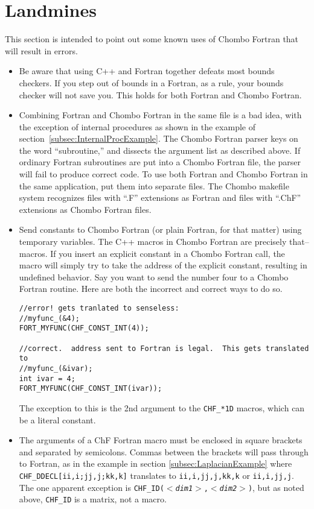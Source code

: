 \section{Landmines}

This section is intended to point out some known uses of Chombo
Fortran that will result in errors.

\begin{itemize}
\item Be aware that using C++ and Fortran together defeats most bounds
checkers.  If you step out of bounds in a Fortran, as a rule, your
bounds checker will not save you.  This holds for both Fortran and
Chombo Fortran.

\item Combining Fortran and Chombo Fortran in the same file is a bad
idea, with the exception of internal procedures as shown in the example
of section~\ref{subsec:InternalProcExample}. The Chombo Fortran parser
keys on the word ``subroutine,'' and
dissects the argument list as described above.  If ordinary Fortran
subroutines are  put into a Chombo Fortran file, the parser will fail
to produce correct code.  To use both Fortran and Chombo Fortran in
the same application, put them into separate files.  The Chombo
makefile system recognizes files with ``.F'' extensions as Fortran
and files with ``.ChF'' extensions as Chombo Fortran files.

\item Send constants to Chombo Fortran (or plain Fortran, for that
matter) using temporary variables.  The C++ macros in Chombo Fortran
are precisely that--macros.  If you insert an explicit constant in a
Chombo Fortran call, the macro will simply try to take the address of
the explicit constant, resulting in undefined behavior.  Say you want
to send the number four to a Chombo Fortran routine.  Here are both
the incorrect and correct ways to do so.
\begin{small}
\begin{verbatim}
//error! gets tranlated to senseless:
//myfunc_(&4);
FORT_MYFUNC(CHF_CONST_INT(4));

//correct.  address sent to Fortran is legal.  This gets translated to 
//myfunc_(&ivar);
int ivar = 4;
FORT_MYFUNC(CHF_CONST_INT(ivar));
\end{verbatim}
\end{small}
The exception to this is the 2nd argument to the {\tt CHF\_*1D} macros, 
which can be a literal constant.

\item The arguments of a ChF Fortran macro must be enclosed
in square brackets and separated by semicolons.
Commas between the brackets
will pass through to Fortran, as in the example in section
\ref{subsec:LaplacianExample} where
{\tt CHF\_DDECL[ii,i;jj,j;kk,k]} translates to
{\tt ii,i,jj,j,kk,k} or {\tt ii,i,jj,j}.
The one apparent exception is
{\tt CHF\_ID($<${\em dim1}$>$,$<${\em dim2}$>$)}, but as noted above,
{\tt CHF\_ID} is a matrix, not a macro.


\end{itemize}
